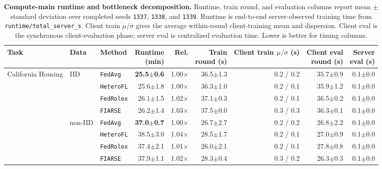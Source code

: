 \begin{table}[H]
\centering
\scriptsize
\renewcommand{\arraystretch}{1.08}
\setlength{\tabcolsep}{2.7pt}
\caption{\textbf{Compute-main runtime and bottleneck decomposition.} Runtime, train round, and evaluation columns report mean $\pm$ standard deviation over completed seeds \texttt{1337}, \texttt{1338}, and \texttt{1339}. Runtime is end-to-end server-observed training time from \texttt{runtime/total\_server\_s}. Client train $\mu/\sigma$ gives the average within-round client-training mean and dispersion. Client eval is the synchronous client-evaluation phase; server eval is centralized evaluation time. Lower is better for timing columns.}
\label{tab:compute_main_runtime}
\begin{adjustbox}{max width=\textwidth}
\begin{tabular}{@{}lllrrrrrr@{}}
\toprule
Task & Data & Method & \makecell[c]{Runtime\\(min)} & Rel. & \makecell[c]{Train\\round (s)} & \makecell[c]{Client train\\$\mu/\sigma$ (s)} & \makecell[c]{Client eval\\round (s)} & \makecell[c]{Server\\eval (s)} \\
\midrule
California Housing & IID & \texttt{FedAvg} & \textbf{25.5$\pm$0.6} & 1.00$\times$ & 36.5$\pm$1.3 & 0.2 / 0.2 & 35.7$\pm$0.9 & 0.1$\pm$0.0 \\
 &  & \texttt{HeteroFL} & 25.6$\pm$1.8 & 1.00$\times$ & 36.3$\pm$1.0 & 0.2 / 0.1 & 35.9$\pm$1.2 & 0.1$\pm$0.0 \\
 &  & \texttt{FedRolex} & 26.1$\pm$1.5 & 1.02$\times$ & 37.1$\pm$0.3 & 0.2 / 0.1 & 36.5$\pm$0.2 & 0.1$\pm$0.0 \\
 &  & \texttt{FIARSE} & 26.2$\pm$1.4 & 1.03$\times$ & 37.5$\pm$0.0 & 0.3 / 0.3 & 36.3$\pm$0.1 & 0.1$\pm$0.0 \\
\midrule
 & non-IID & \texttt{FedAvg} & \textbf{37.0$\pm$0.7} & 1.00$\times$ & 26.7$\pm$2.7 & 0.2 / 0.2 & 26.8$\pm$2.2 & 0.1$\pm$0.0 \\
 &  & \texttt{HeteroFL} & 38.5$\pm$3.0 & 1.04$\times$ & 28.5$\pm$1.7 & 0.2 / 0.1 & 27.0$\pm$0.9 & 0.1$\pm$0.0 \\
 &  & \texttt{FedRolex} & 37.4$\pm$2.1 & 1.01$\times$ & 26.0$\pm$2.1 & 0.2 / 0.1 & 27.8$\pm$0.8 & 0.1$\pm$0.0 \\
 &  & \texttt{FIARSE} & 37.9$\pm$1.1 & 1.02$\times$ & 28.3$\pm$0.4 & 0.3 / 0.2 & 26.3$\pm$0.3 & 0.1$\pm$0.0 \\

\end{tabular}
\end{adjustbox}
\end{table}
